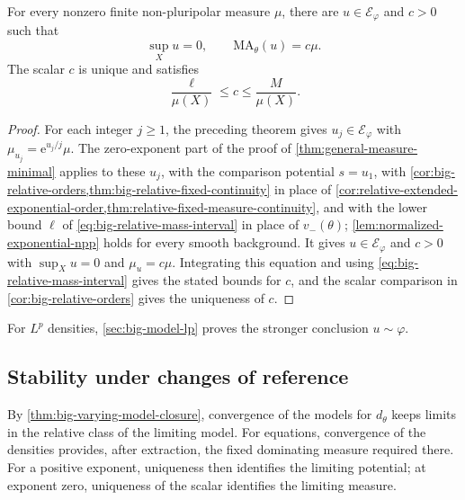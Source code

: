\begin{theorem}\label{thm:big-model-normalized}
For every nonzero finite non-pluripolar measure $\mu$, there are $u\in\mathcal E_\varphi$ and $c>0$ such that
\[
 \sup_Xu=0,\qquad \mathrm{MA}_\theta(u)=c\mu.
\]
The scalar $c$ is unique and satisfies
\[
 \frac{\ell}{\mu(X)}\leq c\leq\frac{M}{\mu(X)}.
\]
\end{theorem}
\begin{proof}
For each integer $j\geq1$, the preceding theorem gives $u_j\in\mathcal E_\varphi$ with $\mu_{u_j}=\mathrm{e}^{u_j/j}\mu$. The zero-exponent part of the proof of \cref{thm:general-measure-minimal} applies to these $u_j$, with the comparison potential $s=u_1$, with \cref{cor:big-relative-orders,thm:big-relative-fixed-continuity} in place of \cref{cor:relative-extended-exponential-order,thm:relative-fixed-measure-continuity}, and with the lower bound $\ell$ of \eqref{eq:big-relative-mass-interval} in place of $v_-(\theta)$; \cref{lem:normalized-exponential-npp} holds for every smooth background. It gives $u\in\mathcal E_\varphi$ and $c>0$ with $\sup_Xu=0$ and $\mu_u=c\mu$. Integrating this equation and using \eqref{eq:big-relative-mass-interval} gives the stated bounds for $c$, and the scalar comparison in \cref{cor:big-relative-orders} gives the uniqueness of $c$.
\end{proof}

For $L^p$ densities, \cref{sec:big-model-lp} proves the stronger conclusion $u\sim\varphi$.

\subsection{Stability under changes of reference}
\label{subsec:big-equation-reference-stability}

By \cref{thm:big-varying-model-closure}, convergence of the models for $d_\theta$ keeps limits in the relative class of the limiting model. For equations, convergence of the densities provides, after extraction, the fixed dominating measure required there. For a positive exponent, uniqueness then identifies the limiting potential; at exponent zero, uniqueness of the scalar identifies the limiting measure.

